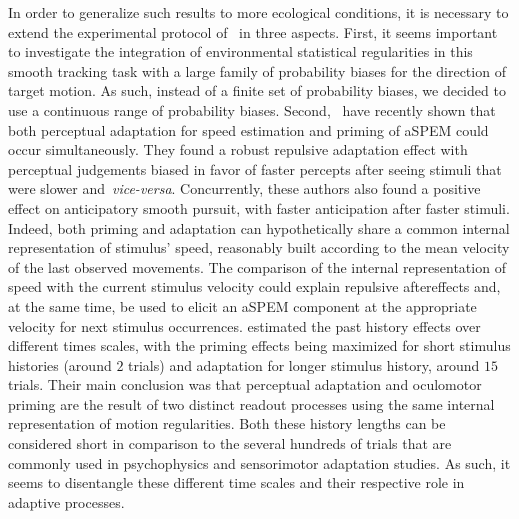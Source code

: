 \documentclass[12pt,english]{article}%
\newcommand{\citet}[1]{\textcite{#1}}
\newcommand{\seeFig}[1]{Figure~\ref{fig:#1}}
\begin{document}
In order to generalize such results to more ecological conditions,
it is necessary to extend the experimental protocol of~\citet{Montagnini2010} in three aspects.
First, it seems important to investigate the integration of environmental statistical regularities
in this smooth tracking task with
a large family of probability biases for the direction of target motion.
As such, instead of a finite set of probability biases, %
we decided to use a continuous range of probability biases.
Second,~\citet{Maus2015} have recently shown that
both perceptual adaptation for speed estimation
and priming of aSPEM could occur simultaneously.
They found a robust repulsive adaptation effect
with perceptual judgements biased in favor of faster percepts
after seeing stimuli that were slower and~\textit{vice-versa}. 
Concurrently, these authors also found
a positive effect on anticipatory smooth pursuit, 
with faster anticipation after faster stimuli.
Indeed, both priming and adaptation can hypothetically share
a common internal representation of stimulus' speed,
reasonably built according to the mean velocity of the last observed movements.
The comparison of the internal representation of speed
with the current stimulus velocity could explain repulsive aftereffects and,
at the same time, be used to elicit
an aSPEM component at the appropriate velocity
for next stimulus occurrences.
\citet{Maus2015} estimated the past history effects over different times scales,
with the priming effects being maximized
for short stimulus histories (around $2$ trials) and
adaptation for longer stimulus history, around $15$ trials.
Their main conclusion was that
perceptual adaptation and oculomotor priming
are the result of two distinct readout processes 
using the same internal representation of motion regularities.
Both these history lengths can be considered
short in comparison to the several hundreds
of trials that are commonly used in psychophysics and sensorimotor adaptation studies.
As such, it seems to disentangle these different time scales 
and their respective role in adaptive processes.
\end{document}
